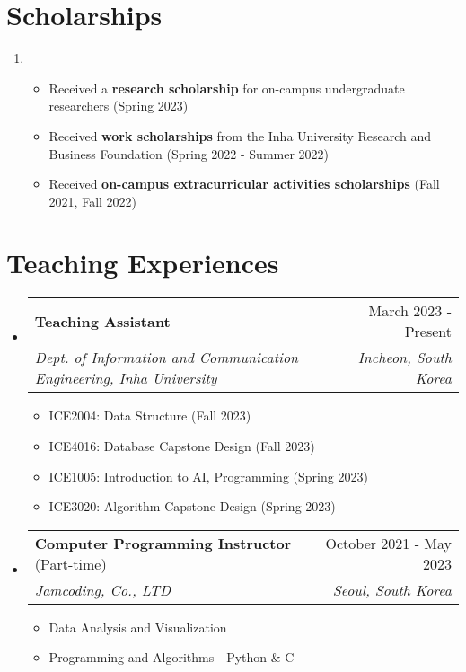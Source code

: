 \documentclass[letterpaper,11pt]{article}
\makeatletter
\newcommand{\resumeSubheading}[4]{
  \vspace{-1pt}\item
    \begin{tabular*}{0.97\textwidth}{l@{\extracolsep{\fill}}r}
      #1 & #2 \\
      \textit{\small#3} & \textit{\small #4} \\
    \end{tabular*}\vspace{-5pt}
}
\makeatother
\begin{document}
    \section{Scholarships}
    \begin{enumerate}[noitemsep, leftmargin=*,label=]
        \item{
            \begin{itemize}[label=\bullet]
                \item{Received a \textbf{research scholarship} for on-campus undergraduate researchers (Spring 2023)}
                \item{Received \textbf{work scholarships} from the Inha University Research and Business Foundation (Spring 2022 - Summer 2022)}
                \item{Received \textbf{on-campus extracurricular activities scholarships} (Fall 2021, Fall 2022)}
                
            \end{itemize}
        }
    \end{enumerate}

    \section{Teaching Experiences}
    \begin{itemize}[leftmargin=*,label=]
        \resumeSubheading
        {\textbf{Teaching Assistant}}{March 2023 - Present}
            {Dept. of Information and Communication Engineering, \href{https://eng.inha.ac.kr/eng/index.do}{Inha University}}{Incheon, South Korea}
            
            \begin{itemize}[label=\bullet]
                \item{
                    ICE2004: Data Structure (Fall 2023)
                }
                \item{
                    ICE4016: Database Capstone Design (Fall 2023)
                }
                \item{
                    ICE1005: Introduction to AI,  Programming (Spring 2023)
                }
                \item{
                    ICE3020: Algorithm Capstone Design (Spring 2023)
                }
            \end{itemize}
            

        \resumeSubheading
        {\textbf{Computer Programming Instructor} (Part-time)}{October 2021 - May 2023}
            {\href{https://jamcoding.co.kr/}{Jamcoding, Co., LTD}}{Seoul, South Korea}
            \begin{itemize}[label=\bullet]
                \item{Data Analysis and Visualization}
                \item{Programming and Algorithms - Python \& C}
            \end{itemize}
    \end{itemize}
\end{document}
